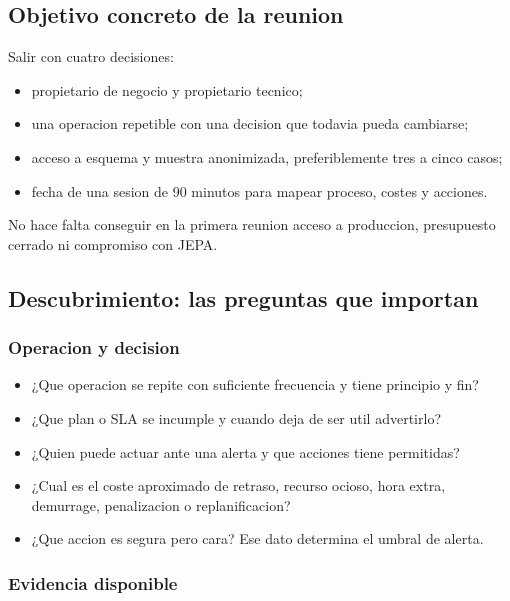 \documentclass[
  spanish,
  10pt,
  a4paper,
]{article}
\providecommand{\tightlist}{%
  \setlength{\itemsep}{0pt}\setlength{\parskip}{0pt}}
\begin{document}
\subsection{Objetivo concreto de la
reunion}\label{objetivo-concreto-de-la-reunion}

Salir con cuatro decisiones:

\begin{itemize}
\tightlist
\item
  propietario de negocio y propietario tecnico;
\item
  una operacion repetible con una decision que todavia pueda cambiarse;
\item
  acceso a esquema y muestra anonimizada, preferiblemente tres a cinco
  casos;
\item
  fecha de una sesion de 90 minutos para mapear proceso, costes y
  acciones.
\end{itemize}

No hace falta conseguir en la primera reunion acceso a produccion,
presupuesto cerrado ni compromiso con JEPA.

\subsection{Descubrimiento: las preguntas que
importan}\label{descubrimiento-las-preguntas-que-importan}

\subsubsection{Operacion y decision}\label{operacion-y-decision}

\begin{itemize}
\tightlist
\item
  ¿Que operacion se repite con suficiente frecuencia y tiene principio y
  fin?
\item
  ¿Que plan o SLA se incumple y cuando deja de ser util advertirlo?
\item
  ¿Quien puede actuar ante una alerta y que acciones tiene permitidas?
\item
  ¿Cual es el coste aproximado de retraso, recurso ocioso, hora extra,
  demurrage, penalizacion o replanificacion?
\item
  ¿Que accion es segura pero cara? Ese dato determina el umbral de
  alerta.
\end{itemize}

\subsubsection{Evidencia disponible}\label{evidencia-disponible}
\end{document}
